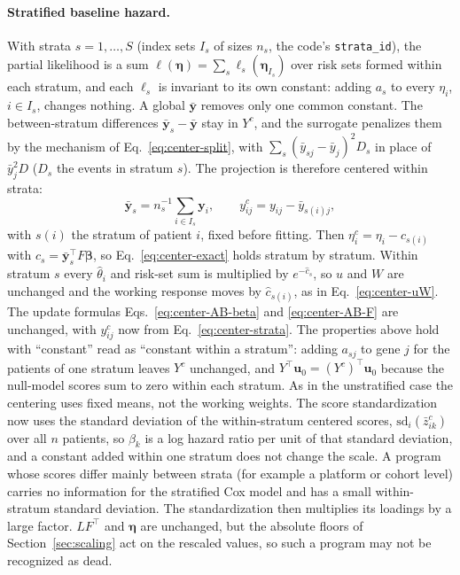 \documentclass[11pt]{article}
\begin{document}
\paragraph{Stratified baseline hazard.} With strata $s = 1,\ldots,S$ (index sets
$I_s$ of sizes $n_s$, the code's \texttt{strata\_id}), the partial likelihood is a
sum $\ell(\bm\eta) = \sum_s \ell_s(\bm\eta_{I_s})$ over risk sets formed within each
stratum, and each $\ell_s$ is invariant to its own constant: adding $a_s$ to every
$\eta_i$, $i\in I_s$, changes nothing. A global $\bar{\bm y}$ removes only one common
constant. The between-stratum differences $\bar{\bm y}_s - \bar{\bm y}$ stay in $Y^c$, and the
surrogate penalizes them by the mechanism of Eq.~\eqref{eq:center-split}, with
$\sum_s(\bar y_{sj} - \bar y_j)^2 D_s$ in place of $\bar y_j^2 D$ ($D_s$ the events in
stratum $s$). The projection is therefore centered within strata:
\begin{equation}\label{eq:center-strata}
  \bar{\bm y}_s = n_s^{-1}\sum_{i\in I_s}\bm y_i, \qquad
  y^c_{ij} = y_{ij} - \bar y_{s(i)j},
\end{equation}
with $s(i)$ the stratum of patient $i$, fixed before fitting. Then
$\eta^c_i = \eta_i - c_{s(i)}$ with $c_s = \bar{\bm y}_s^\top F\bm\beta$, so
Eq.~\eqref{eq:center-exact} holds stratum by stratum. Within stratum $s$ every
$\hat\theta_i$ and risk-set sum is multiplied by $e^{-\hat c_s}$, so $u$ and $W$ are
unchanged and the working response moves by $\hat c_{s(i)}$, as in
Eq.~\eqref{eq:center-uW}. The update formulas Eqs.~\eqref{eq:center-AB-beta} and
\eqref{eq:center-AB-F} are unchanged, with $y^c_{ij}$ now from
Eq.~\eqref{eq:center-strata}. The properties above hold with ``constant'' read as
``constant within a stratum'': adding $a_{sj}$ to gene $j$ for the patients of one
stratum leaves $Y^c$ unchanged, and $Y^\top\bm u_0 = (Y^c)^\top\bm u_0$ because the
null-model scores sum to zero within each stratum. As in the unstratified case the
centering uses fixed means, not the working weights. The score standardization now
uses the standard deviation of the within-stratum centered scores,
$\mathrm{sd}_i(\bar z^c_{ik})$ over all $n$ patients, so $\beta_k$ is a log hazard ratio
per unit of that standard deviation, and a constant added within one stratum does
not change the scale. A program whose scores differ mainly between strata (for
example a platform or cohort level) carries no information for the stratified
Cox model and has a small within-stratum standard deviation. The standardization
then multiplies its loadings by a large factor. $LF^\top$ and $\bm\eta$ are
unchanged, but the absolute floors of Section~\ref{sec:scaling} act on the
rescaled values, so such a program may not be recognized as dead.
\end{document}
